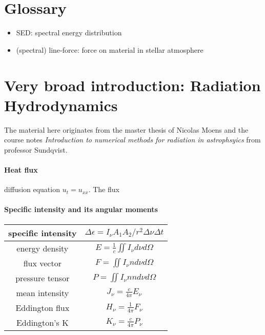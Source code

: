 \documentclass[../main/main.tex]{subfiles}
\begin{document}
\section{Glossary}
\begin{itemize}
\item SED: \hfill spectral energy distribution

\item (spectral) line-force: \hfill force on material in stellar atmosphere
\end{itemize}


\newpage
\section{Very broad introduction: Radiation Hydrodynamics}
The material here originates from the master thesis of Nicolas Moens and the course notes \textit{Introduction to numerical methods for radiation in astrophsyics} from professor Sundqvist. 

\paragraph{Heat flux}
diffusion equation $u_t = u_{xx}$. The flux  

\paragraph{Specific intensity and its angular moments}

\begin{center}
\centering
{\tabulinesep=1.5mm
\begin{tabu}{|c|c|}
\hline 
specific intensity & $\Delta \epsilon = \boxed{I_{\nu}} A_1 A_2/r^2 \Delta \nu \Delta t$ \\ \hline
energy density & $E = \frac{1}{c} \iint I_{\nu} d\nu d\Omega$ \\ \hline
flux vector & $F = \iint I_{\nu}n d\nu d\Omega$ \\ \hline
pressure tensor & $P = \iint I_{\nu} nn d\nu d\Omega$ \\ \hline
mean intensity & $J_{\nu} = \frac{c}{4 \pi} E_{\nu}$ \\ \hline
Eddington flux & $H_{\nu} = \frac{1}{4 \pi} F_{\nu}$ \\ \hline
Eddington's K & $K_{\nu} = \frac{c}{4 \pi}P_{\nu}$ \\ \hline
\end{tabu}}
\end{center}
\end{document}
